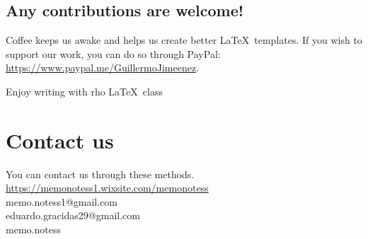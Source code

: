 \documentclass[9pt,a4paper,twoside]{rho-class/rho}
\begin{document}
    \subsection*{Any contributions are welcome!}
    
        Coffee keeps us awake and helps us create better \LaTeX\ templates. If you wish to support our work, you can do so through PayPal:\\
        \url{https://www.paypal.me/GuillermoJimeenez}.
        
        \begin{center}
            Enjoy writing with rho \LaTeX\ class\hspace{5pt}\faChessKnight 
        \end{center}

\section{Contact us}

    You can contact us through these methods.\\
    
    \noindent\faWix\hspace{5pt}\href{https://memonotess1.wixsite.com/memonotess}{https://memonotess1.wixsite.com/memonotess} \\
    \faEnvelope[regular]\hspace{7pt}memo.notess1@gmail.com \\
    \faEnvelope[regular]\hspace{7pt}eduardo.gracidas29@gmail.com \\
    \faInstagram\hspace{8pt}memo.notess
        

\printbibliography

\end{document}
